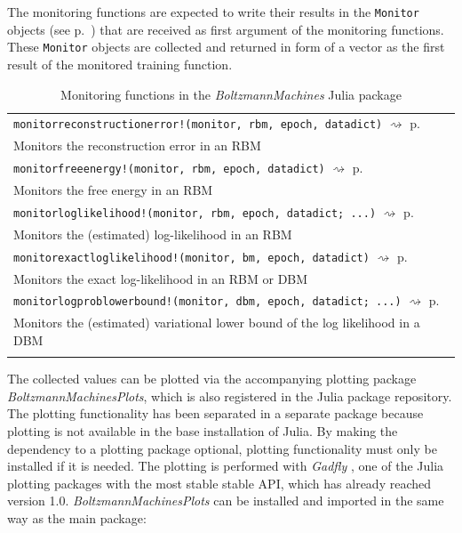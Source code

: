 \documentclass[12pt]{article}
\newcommand{\inlinecode}[1]{\texttt{#1}}
\newcommand{\apkg}[1]{\emph{#1}}
\newcommand{\rightpageref}[1]{\hfill $\rightsquigarrow$ p.\ \pageref{#1}}
\begin{document}
The monitoring functions are expected to write their results in the \inlinecode{Monitor} objects (see p.\ \pageref{bms_Monitor}) that are received as first argument of the monitoring functions.
These \inlinecode{Monitor} objects are collected and returned in form of a vector as the first result of the monitored training function.


\begin{table}[h]
\caption{Monitoring functions in the \apkg{BoltzmannMachines} Julia package}
\label{monfun}
   \begin{tabularx}{\textwidth}{X}
 \Xhline{1pt}
   \inlinecode{monitorreconstructionerror!(monitor, rbm, epoch, datadict)} \rightpageref{bms_monitorreconstructionerror!}\\
     Monitors the reconstruction error in an RBM \\
     \inlinecode{monitorfreeenergy!(monitor, rbm, epoch, datadict)} \rightpageref{bms_monitorfreeenergy!}\\ 
Monitors the free energy in an RBM \\
     \inlinecode{monitorloglikelihood!(monitor, rbm, epoch, datadict; ...)} \rightpageref{bms_monitorloglikelihood!}\\ 
Monitors the (estimated) log-likelihood in an RBM \\
        \inlinecode{monitorexactloglikelihood!(monitor, bm, epoch, datadict)} \rightpageref{bms_monitorexactloglikelihood!}\\ 
Monitors the exact log-likelihood in an RBM or DBM \\
     \inlinecode{monitorlogproblowerbound!(monitor, dbm, epoch, datadict; ...)} \rightpageref{bms_monitorlogproblowerbound!}\\
  Monitors the (estimated) variational lower bound of the log likelihood in a DBM \\
   \Xhline{1pt}
\end{tabularx}
\end{table}

The collected values can be plotted via the accompanying plotting package \apkg{Boltzmann\-Machines\-Plots}, which is also registered in the Julia package repository.
The plotting functionality has been separated in a separate package because plotting is not available in the base installation of Julia.
By making the dependency to a plotting package optional, plotting functionality must only be installed if it is needed.
The plotting is performed with \apkg{Gadfly} \citep{gadfly}, one of the Julia plotting packages with the most stable stable API, which has already reached version 1.0.
\apkg{BoltzmannMachinesPlots} can be installed and imported in the same way as the main package:
\end{document}
